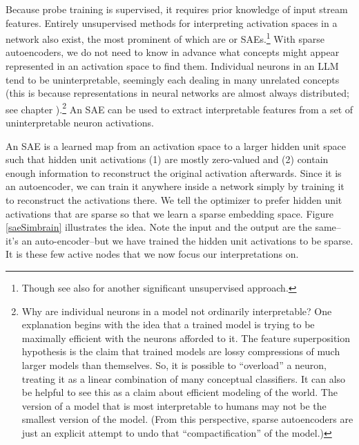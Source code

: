 Because probe training is supervised, it requires prior knowledge of input
stream features. Entirely unsupervised methods for interpreting activation
spaces in a network also exist, the most prominent of which are
 or SAEs.\footnote{Though see also
\cite{burns2024discovering} for another significant unsupervised approach.}
With sparse autoencoders, we do not need to know in advance what concepts might
appear represented in an activation space to find them. Individual neurons in
an LLM tend to be uninterpretable, seemingly each dealing in many unrelated
concepts \cite{elhage2022superposition, scherlis2025polysemanticity} (this is
because representations in neural networks are almost always distributed; see
chapter ).\footnote{Why are individual neurons in a model not
ordinarily interpretable? One explanation begins with the idea that a trained
model is trying to be maximally efficient with the neurons afforded to it. The
feature superposition hypothesis is the claim that trained models are lossy
compressions of much larger models than themselves. So, it is possible to
``overload'' a neuron, treating it as a linear combination of many conceptual
classifiers. It can also be helpful to see this as a claim about efficient
modeling of the world. The version of a model that is most interpretable to
humans may not be the smallest version of the model. (From this perspective,
sparse autoencoders are just an explicit attempt to undo that
``compactification'' of the model.)} An SAE can be used to extract
interpretable features from a set of uninterpretable neuron activations.

An SAE is a learned map from an activation space to a larger hidden unit space
such that hidden unit activations (1) are mostly zero-valued and (2) contain
enough information to reconstruct the original activation afterwards. Since it
is an autoencoder, we can train it anywhere inside a network simply by training
it to reconstruct the activations there. We tell the optimizer to prefer hidden
unit activations that are sparse so that we learn a sparse embedding space.
Figure \ref{saeSimbrain} illustrates the idea. Note the input and the output
are the same--it's an auto-encoder--but we have trained the hidden unit
activations to be sparse. It is these few active nodes that we now focus our
interpretations on.

